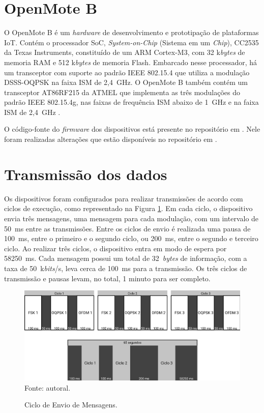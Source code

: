 \section{OpenMote B}
O OpenMote B é um \emph{hardware} de desenvolvimento e prototipação de plataformas IoT. Contém o processador SoC, \emph{System-on-Chip} (Sistema em um \emph{Chip}), CC2535 da Texas Instruments, constituído de um ARM Cortex-M3, com 32 k\emph{bytes} de memoria RAM e 512 k\emph{bytes} de memoria Flash. Embarcado nesse processador, há um transceptor com suporte ao padrão IEEE 802.15.4 que utiliza a modulação DSSS-OQPSK na faixa ISM de 2,4~GHz. O OpenMote B também contém um transceptor AT86RF215 da ATMEL que implementa as três modulações do padrão IEEE 802.15.4g, nas faixas de frequência ISM abaixo de 1~GHz e na faixa ISM de 2,4~GHz \cite{openmoteb-userguide}.

O código-fonte do \emph{firmware} dos dispositivos está presente no repositório em \cite{openmoteb-firmware}. Nele foram realizadas alterações que estão disponíveis no repositório em \cite{openmoteb-gcompi}.

\section{Transmissão dos dados}
Os dispositivos foram configurados para realizar transmissões de acordo com ciclos de execução, como representado na Figura \ref{fig:ciclo_envio}. Em cada ciclo, o dispositivo envia três mensagens, uma mensagem para cada modulação, com um intervalo de 50~ms entre as transmissões. Entre os ciclos de envio é realizada uma pausa de 100~ms, entre o primeiro e o segundo ciclo, ou 200~ms, entre o segundo e terceiro ciclo. Ao realizar três ciclos, o dispositivo entra em modo de espera por 58250~ms. Cada mensagem possui um total de 32~\emph{bytes} de informação, com a taxa de 50~k\emph{bits}/s, leva cerca de 100~ms para a transmissão. Os três ciclos de transmissão e pausas levam, no total, 1 minuto para ser completo.

\begin{figure}[H]
  \centering
  \caption{Ciclo de Envio de Mensagens.}
  \includegraphics[width=\textwidth]{./sections/textual/chapters/images/metodo_ciclo_envio.png}\\
  Fonte: autoral.
  \label{fig:ciclo_envio}
\end{figure}


